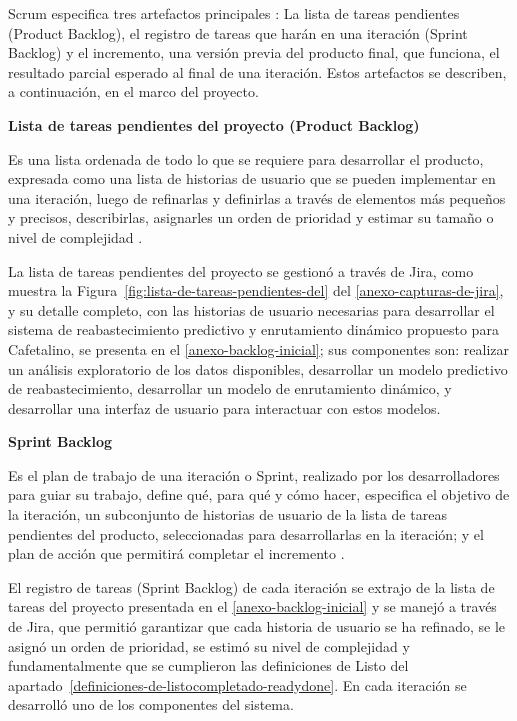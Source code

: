 Scrum especifica tres artefactos principales \citep{schwaber2020}: La lista de tareas pendientes (Product Backlog), el registro de tareas que harán en una iteración (Sprint Backlog) y el incremento, una versión previa del producto final, que funciona, el resultado parcial esperado al final de una iteración. Estos artefactos se describen, a continuación, en el marco del proyecto.

\textbf{Lista de tareas pendientes del proyecto (Product Backlog)}

Es una lista ordenada de todo lo que se requiere para desarrollar el producto, expresada como una lista de historias de usuario que se pueden implementar en una iteración, luego de refinarlas y definirlas a través de elementos más pequeños y precisos, describirlas, asignarles un orden de prioridad y estimar su tamaño o nivel de complejidad \citep{schwaber2020}.

La lista de tareas pendientes del proyecto se gestionó a través de Jira, como muestra la Figura~\ref{fig:lista-de-tareas-pendientes-del} del \ref{anexo-capturas-de-jira}, y su detalle completo, con las historias de usuario necesarias para desarrollar el sistema de reabastecimiento predictivo y enrutamiento dinámico propuesto para Cafetalino, se presenta en el \ref{anexo-backlog-inicial}; sus componentes son: realizar un análisis exploratorio de los datos disponibles, desarrollar un modelo predictivo de reabastecimiento, desarrollar un modelo de enrutamiento dinámico, y desarrollar una interfaz de usuario para interactuar con estos modelos.

\textbf{Sprint Backlog}

Es el plan de trabajo de una iteración o Sprint, realizado por los desarrolladores para guiar su trabajo, define qué, para qué y cómo hacer, especifica el objetivo de la iteración, un subconjunto de historias de usuario de la lista de tareas pendientes del producto, seleccionadas para desarrollarlas en la iteración; y el plan de acción que permitirá completar el incremento \citep{schwaber2020}.

El registro de tareas (Sprint Backlog) de cada iteración se extrajo de la lista de tareas del proyecto presentada en el \ref{anexo-backlog-inicial} y se manejó a través de Jira, que permitió garantizar que cada historia de usuario se ha refinado, se le asignó un orden de prioridad, se estimó su nivel de complejidad y fundamentalmente que se cumplieron las definiciones de Listo del apartado~\ref{definiciones-de-listocompletado-readydone}. En cada iteración se desarrolló uno de los componentes del sistema.

